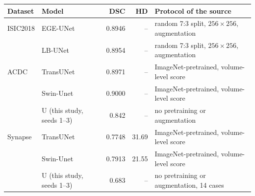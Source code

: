 \begin{tabular}{@{}llrrl@{}}
\toprule
Dataset & Model & DSC & HD\tnote{a} & Protocol of the source \\
\midrule
ISIC2018 & EGE-UNet \citep{Ruan2023EGEUNet} & 0.8946 & -- & random 7:3 split, $256\times256$, augmentation \\
 & LB-UNet \citep{Xu2024LBUNet} & 0.8954 & -- & random 7:3 split, $256\times256$, augmentation \\
ACDC & TransUNet \citep{Chen2021TransUNetArxiv} & 0.8971 & -- & ImageNet-pretrained, volume-level score \\
 & Swin-Unet \citep{Cao2022SwinUnet} & 0.9000 & -- & ImageNet-pretrained, volume-level score \\
 & U (this study, seeds 1--3)\tnote{b} & 0.842 & -- & no pretraining or augmentation \\
\addlinespace
Synapse & TransUNet \citep{Chen2021TransUNetArxiv} & 0.7748 & 31.69 & ImageNet-pretrained, volume-level score \\
 & Swin-Unet \citep{Cao2022SwinUnet} & 0.7913 & 21.55 & ImageNet-pretrained, volume-level score \\
 & U (this study, seeds 1--3)\tnote{b} & 0.683 & -- & no pretraining or augmentation, 14 cases \\
\bottomrule
\end{tabular}
